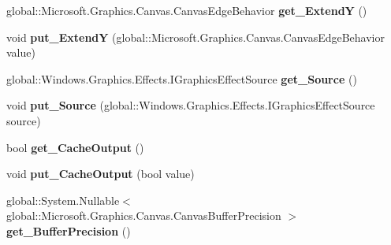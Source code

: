 \begin{DoxyCompactItemize}
global\+::\+Microsoft.\+Graphics.\+Canvas.\+Canvas\+Edge\+Behavior {\bfseries get\+\_\+\+ExtendY} ()
\item 
\mbox{\label{class_microsoft_1_1_graphics_1_1_canvas_1_1_effects_1_1_border_effect_aaae1874ec7b1b2630d7636442f2c79c0}} 
void {\bfseries put\+\_\+\+ExtendY} (global\+::\+Microsoft.\+Graphics.\+Canvas.\+Canvas\+Edge\+Behavior value)
\item 
\mbox{\label{class_microsoft_1_1_graphics_1_1_canvas_1_1_effects_1_1_border_effect_ad3238a486519b9e346560be58abbd303}} 
global\+::\+Windows.\+Graphics.\+Effects.\+I\+Graphics\+Effect\+Source {\bfseries get\+\_\+\+Source} ()
\item 
\mbox{\label{class_microsoft_1_1_graphics_1_1_canvas_1_1_effects_1_1_border_effect_aff45744a28e3679714ecb278ca56bffc}} 
void {\bfseries put\+\_\+\+Source} (global\+::\+Windows.\+Graphics.\+Effects.\+I\+Graphics\+Effect\+Source source)
\item 
\mbox{\label{class_microsoft_1_1_graphics_1_1_canvas_1_1_effects_1_1_border_effect_a301b900c39be029d992cd9fa734be8f5}} 
bool {\bfseries get\+\_\+\+Cache\+Output} ()
\item 
\mbox{\label{class_microsoft_1_1_graphics_1_1_canvas_1_1_effects_1_1_border_effect_a4d808949ea25fb186b222dacfafb5f3d}} 
void {\bfseries put\+\_\+\+Cache\+Output} (bool value)
\item 
\mbox{\label{class_microsoft_1_1_graphics_1_1_canvas_1_1_effects_1_1_border_effect_aa853f136a383f77a6a88d5b0ad1986d0}} 
global\+::\+System.\+Nullable$<$ global\+::\+Microsoft.\+Graphics.\+Canvas.\+Canvas\+Buffer\+Precision $>$ {\bfseries get\+\_\+\+Buffer\+Precision} ()
\item 
\mbox{\label{class_microsoft_1_1_graphics_1_1_canvas_1_1_effects_1_1_border_effect_ad0a2a864ab5e877cab4f45872da3c27e}} 

\end{DoxyCompactItemize}
